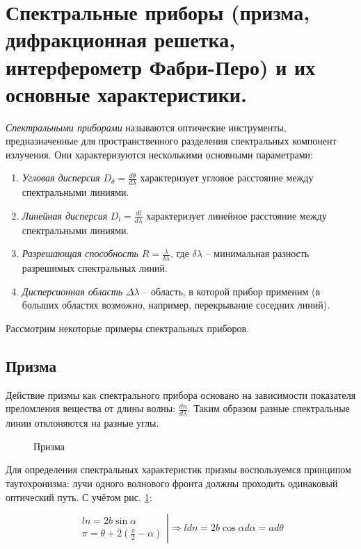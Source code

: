 \section{Спектральные приборы (призма, дифракционная решетка, интерферометр Фабри-Перо) и их основные характеристики.}

\textit{Спектральными приборами} называются оптические инструменты, предназначенные для пространственного разделения спектральных компонент излучения. Они характеризуются несколькими основными параметрами:

\begin{enumerate}
    \item \textit{Угловая дисперсия} $D_\theta = \frac{d \theta}{d \lambda}$ характеризует угловое расстояние между спектральными линиями.
    \item \textit{Линейная дисперсия} $D_l = \frac{d l}{d \lambda}$ характеризует линейное расстояние между спектральными линиями.
    \item \textit{Разрешающая способность} $R = \frac{\lambda}{\delta \lambda}$, где $\delta \lambda$ -- минимальная разность разрешимых спектральных линий.
    \item \textit{Дисперсионная область} $\Delta \lambda$ -- область, в которой прибор применим (в больших областях возможно, например, перекрывание соседних линий).
\end{enumerate}

Рассмотрим некоторые примеры спектральных приборов.

\subsection{Призма}

Действие призмы как спектрального прибора основано на зависимости показателя преломления вещества от длины волны: $\frac{d n }{d \lambda}$. Таким образом разные спектральные линии отклоняются на разные углы.

\begin{figure}[htbp]
    \centering
    
    \caption{Призма}
    \label{fig:призма}
\end{figure}

Для определения спектральных характеристик призмы воспользуемся принципом таутохронизма: лучи одного волнового фронта должны проходить одинаковый оптический путь. С учётом рис. \ref{fig:призма}:

\begin{equation*}
    \left.
        \begin{aligned}
            l n = 2 b \sin \alpha \\
            \pi = \theta + 2 \left( \frac{\pi}{2} - \alpha \right)
        \end{aligned}
    \right| \Rightarrow l d n = 2 b \cos \alpha d \alpha = a d \theta
\end{equation*}

